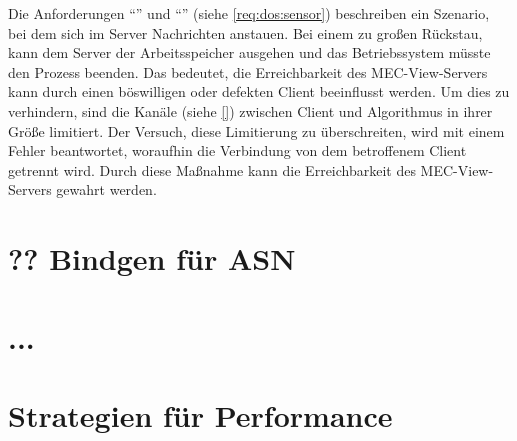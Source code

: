 Die Anforderungen  \enquote{} und  \enquote{} (siehe \autoref{req:dos:sensor}) beschreiben ein Szenario, bei dem sich im Server Nachrichten anstauen.
Bei einem zu großen Rückstau, kann dem Server der Arbeitsspeicher ausgehen und das Betriebssystem müsste den Prozess beenden.
Das bedeutet, die Erreichbarkeit des MEC-View-Servers kann durch einen böswilligen oder defekten Client beeinflusst werden.
Um dies zu verhindern, sind die Kanäle (siehe \autoref{}) zwischen Client und Algorithmus in ihrer Größe limitiert.
Der Versuch, diese Limitierung zu überschreiten, wird mit einem Fehler beantwortet, woraufhin die Verbindung von dem betroffenem Client getrennt wird.
Durch diese Maßnahme kann die Erreichbarkeit des MEC-View-Servers gewahrt werden.

\clearpage
\section{?? Bindgen für ASN}

\label{impl:issue:ffi}



\section{...}






\section{Strategien für Performance}






